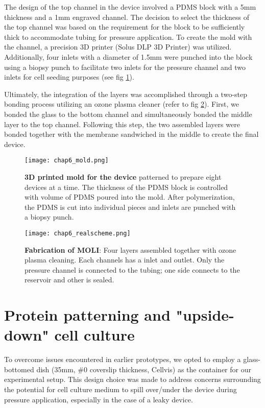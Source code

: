 The design of the top channel in the device involved a PDMS block with a 5\unit{\mm} thickness and a 1mm engraved channel. The decision to select the thickness of the top channel was based on the requirement for the block to be sufficiently thick to accommodate tubing for pressure application.  To create the mold with the channel, a precision 3D printer (Solus DLP 3D Printer) was utilized. Additionally, four inlets with a diameter of 1.5\unit{\mm} were punched into the block using a biopsy punch to facilitate two inlets for the pressure channel and two inlets for cell seeding purposes  (see fig \ref{fig_6_1a}).

Ultimately, the integration of the layers was accomplished through a two-step bonding process utilizing an ozone plasma cleaner (refer to fig \ref{fig_6_2}). First, we bonded the glass to the bottom channel and simultaneously bonded the middle layer to the top channel. Following this step, the two assembled layers were bonded together with the membrane sandwiched in the middle to create the final device.

\begin{figure}[]
	\centering
	\texttt{[image: chap6\_mold.png]}
	\caption{ \textbf{3D printed mold for the device} patterned to prepare eight devices at a time. The thickness of the PDMS block is controlled with volume of PDMS poured into the mold. After polymerization, the PDMS is cut into individual pieces and inlets are punched with a biopsy punch.}\label{fig_6_1a}
\end{figure}

\begin{figure}[]
	\centering
	\texttt{[image: chap6\_realscheme.png]}
	\caption{ \textbf{Fabrication of MOLI}: Four layers assembled together with ozone plasma cleaning. Each channels has a inlet and outlet. Only the pressure channel is connected to the tubing; one side connects to the reservoir and other is sealed. 
	}\label{fig_6_2}
\end{figure}

\hypertarget{protein-patterning-and-inverted-cell-culture}{%
\section{Protein patterning and "upside-down" cell
culture}\label{protein-patterning-and-inverted-cell-culture}}

To overcome issues encountered in earlier prototypes, we opted to employ a glass-bottomed dish (35\unit{\mm}, \#0 coverslip thickness, Cellvis) as the container for our experimental setup. This design choice was made to address concerns surrounding the potential for cell culture medium to spill over/under the device during pressure application, especially in the case of a leaky device. 

